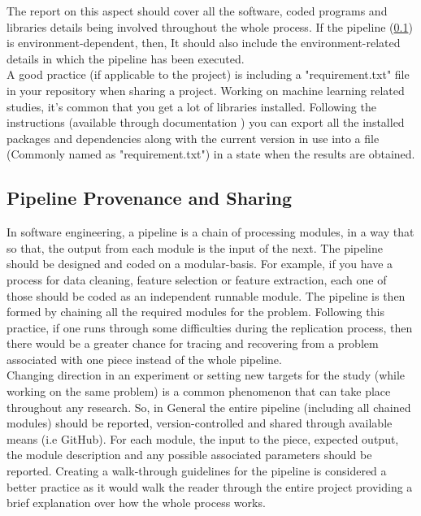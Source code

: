     The report on this aspect should cover all the software, coded programs and libraries details being involved throughout the whole process.
    If the pipeline (\ref{sec:PipelineProvenance}) is environment-dependent, then, It should also include the environment-related 
    details in which the pipeline has been executed.\\

    A good practice (if applicable to the project) is including a "requirement.txt" file in your repository when sharing a project. 
    Working on machine learning related studies, it’s common that you get a lot of libraries installed. 
    Following the instructions (available through documentation \cite{pipDoc}) you can export all the 
    installed packages and dependencies along with the current version in use into a file (Commonly named as "requirement.txt") in a state when
    the results are obtained.
    

\subsection{Pipeline Provenance and Sharing}
    \label{sec:PipelineProvenance}
    
    In software engineering, a pipeline is a chain of processing modules, in a way that so that, the output from each module is the 
    input of the next. The pipeline should be designed and coded on a modular-basis. For example, if you have a process for data cleaning, 
    feature selection or feature extraction, each one of those should be coded as an independent runnable module. The pipeline is then formed 
    by chaining all the required modules for the problem. Following this practice, if one runs through some difficulties during the replication process, 
    then there would be a greater chance for tracing and recovering from a problem associated with one piece instead of the 
    whole pipeline.\\
    
    Changing direction in an experiment or setting new targets for the study (while working on the same problem) is a common phenomenon that 
    can take place throughout any research. So, in General the entire pipeline (including all chained modules) should be reported, 
    version-controlled and shared through available means (i.e GitHub). For each module, the input to the piece, expected output, 
    the module description and any possible associated parameters should be reported. 
    Creating a walk-through guidelines for the pipeline is considered a better practice as it would walk the reader through the entire project 
    providing a brief explanation over how the whole process works.\\
    
